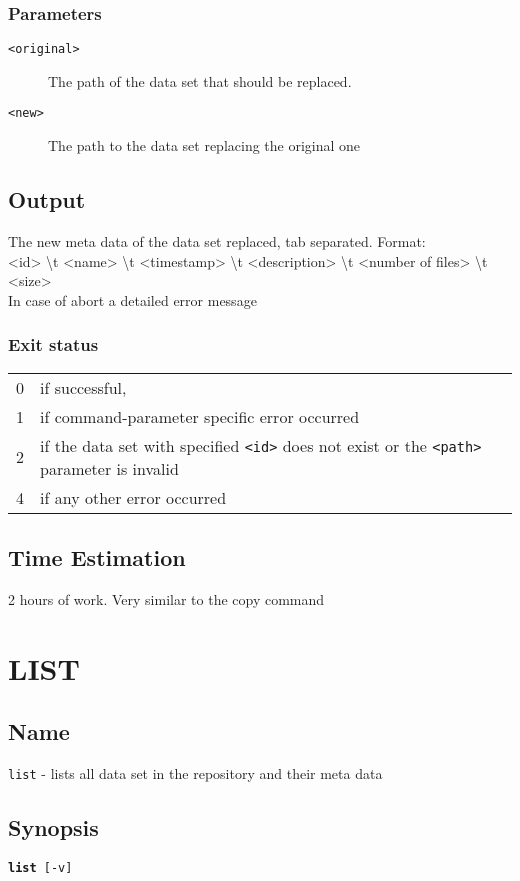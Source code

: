 \documentclass{article} %
\begin{document}
		\subsubsection*{Parameters}
		\begin{description}
			\item[\texttt{<original>}] The path of the data set that should be replaced.
			\item[\texttt{<new>}] The path to the data set replacing the original one
		\end{description}
		\subsection*{Output}
		The new meta data of the data set replaced, tab separated. Format:\\<id> \textbackslash t <name> \textbackslash t <timestamp> \textbackslash t <description> \textbackslash t <number of files> \textbackslash t <size>\\
		In case of abort a detailed error message
		\subsubsection*{Exit status}
		\begin{tabular}{ll}
			0 &  if successful,\\ 
			1 &  if command-parameter specific error occurred\\
			2 &  if the data set with specified \texttt{<id>} does not exist or the \texttt{<path>} parameter is invalid\\
			4 &  if any other error occurred\\
		\end{tabular}
				\subsection*{Time Estimation}
				2 hours of work. Very similar to the copy command\\
				\noindent
		\newpage
		\section*{LIST}
		\subsection*{Name}
		\texttt{list} - lists all data set in the repository and their meta data
		\subsection*{Synopsis}
		\texttt{\textbf{list} [-v]}
\end{document}
